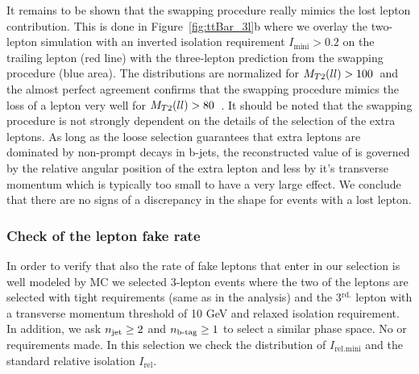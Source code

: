 It remains to be shown that the swapping procedure really mimics the lost lepton contribution. This is done in Figure~\ref{fig:ttBar_3l}b where we overlay the two-lepton simulation with an inverted
isolation requirement $I_{\text{mini}}>0.2$ on the trailing lepton (red line) with the three-lepton prediction from the swapping procedure (blue area). 
The distributions are normalized for $M_{T2}(ll)>100$~\GeV and the almost perfect agreement confirms that the swapping procedure mimics the loss of a lepton very well for $M_{T2}(ll)>80$~\GeV. 
It should be noted that the swapping
procedure is not strongly dependent on the details of the selection of the extra leptons. As long as the loose selection guarantees that extra leptons are dominated by non-prompt decays in b-jets,
the reconstructed value of \mtll is governed by the relative angular position of the extra lepton and less by it's transverse momentum which is typically too small to have a very large effect.
We conclude that there are no signs of a discrepancy in the \mtll shape for events with a lost lepton.

\subsubsection{ Check of the lepton fake rate }
In order to verify that also the rate of fake leptons that enter in our selection is well modeled by MC we selected 3-lepton events where the two of the leptons are selected with tight requirements (same as in the analysis) and the 3${}^{\text{rd.}}$ lepton with a transverse momentum threshold of 10 GeV and relaxed isolation requirement. 
In addition, we ask $n_\text{jet}\geq2$ and $n_\text{b-tag}\geq1$ to select a similar phase space. No \ETmiss or \metSig requirements made. In this selection we check the distribution of $I_{\text{rel.mini}}$ and the standard relative isolation $I_{\text{rel}}$. 

